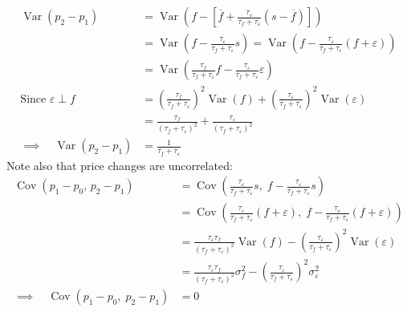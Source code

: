 \documentclass[12pt]{article}
\theoremstyle{plain}
\theoremstyle{definition}
\theoremstyle{remark}
\newcommand{\Cov}{\operatorname{Cov}}
\newcommand{\Var}{\operatorname{Var}}
\begin{document}
\begin{align*}
  \Var(p_2-p_1)
  &=
  \Var\left(
    f
    - \left[
    \overline{f}
    + \frac{\tau_\varepsilon}{\tau_f+\tau_\varepsilon}
    (s-\overline{f})
    \right]
  \right)
  \\
  &=
  \Var\left(
    f
    - \frac{\tau_\varepsilon}{\tau_f+\tau_\varepsilon} s
  \right)
  =
  \Var\left(
    f
    - \frac{\tau_\varepsilon}{\tau_f+\tau_\varepsilon} (f+\varepsilon)
  \right)
  \\
  &=
  \Var\left(
   \frac{\tau_f}{\tau_f+\tau_\varepsilon} f
    - \frac{\tau_\varepsilon}{\tau_f+\tau_\varepsilon} \varepsilon
  \right)
  \\
  \text{Since $\varepsilon\perp f$}\qquad
  &=
  \left(\frac{\tau_f}{\tau_f+\tau_\varepsilon}\right)^2
  \Var\left(
    f
  \right)
  +
  \left(\frac{\tau_\varepsilon}{\tau_f+\tau_\varepsilon}\right)^2
  \Var\left(
  \varepsilon
  \right)
  \\
  &=
  \frac{\tau_f}{\left(\tau_f+\tau_\varepsilon\right)^2}
  + \frac{\tau_\varepsilon}{\left(\tau_f+\tau_\varepsilon\right)^2}
  \\
  \implies\quad
  \Var(p_2-p_1)
  &= \frac{1}{\tau_f+\tau_\varepsilon}
\end{align*}
Note also that price changes are uncorrelated:
\begin{align*}
  \Cov(p_1-p_0,\,p_2-p_1)
  &=
  \Cov\left(
    \frac{\tau_\varepsilon}{\tau_f+\tau_\varepsilon}
    s
    ,\;
    f - \frac{\tau_\varepsilon}{\tau_f+\tau_\varepsilon} s
  \right)
  \\
  &=
  \Cov\left(
    \frac{\tau_\varepsilon}{\tau_f+\tau_\varepsilon} (f+\varepsilon)
    ,\;
    f
    - \frac{\tau_\varepsilon}{\tau_f+\tau_\varepsilon} (f+\varepsilon)
  \right)
  \\
  &=
  \frac{\tau_\varepsilon\tau_f}{(\tau_f+\tau_\varepsilon)^2}
  \Var(f)
  - \left(\frac{\tau_\varepsilon}{\tau_f+\tau_\varepsilon}\right)^2
  \Var(\varepsilon)
  \\
  &=
  \frac{\tau_\varepsilon\tau_f}{(\tau_f+\tau_\varepsilon)^2}
  \sigma^2_f
  - \left(\frac{\tau_\varepsilon}{\tau_f+\tau_\varepsilon}\right)^2
  \sigma^2_\varepsilon
  \\
  \implies\quad
  \Cov(p_1-p_0,\;p_2-p_1)
  &= 0
\end{align*}
\end{document}
